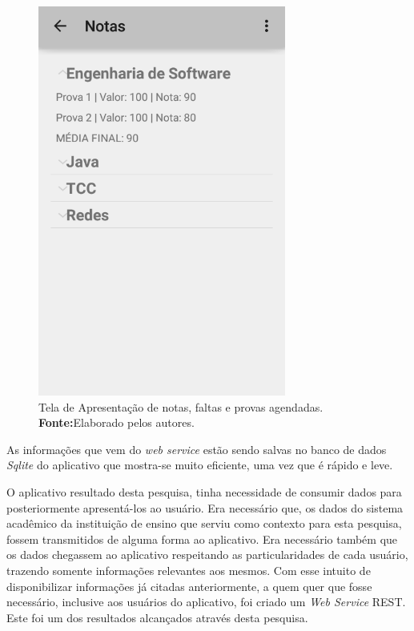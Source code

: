 \begin{figure}[h!]
	\centerline{\includegraphics[scale=0.5]{./imagens/3_discussao_resultados/dr3.png}}
	\caption[Tela de Apresentação de notas, faltas e provas agendadas]{Tela de
	Apresentação de notas, faltas e provas agendadas.
		\textbf{Fonte:}Elaborado pelos autores.}
	\label{fig:dr3}
\end{figure}

	\par As informações que vem do \textit{web service} estão sendo salvas no banco
de dados \textit{Sqlite} do aplicativo que mostra-se muito eficiente, uma vez
que é rápido e leve. 

	\par O aplicativo resultado desta pesquisa, tinha necessidade de consumir
dados para posteriormente apresentá-los ao usuário. Era necessário que, os
dados do sistema acadêmico da instituição de ensino que serviu como contexto
para esta pesquisa, fossem transmitidos de alguma forma ao aplicativo. Era
necessário também que os dados chegassem ao aplicativo respeitando as
particularidades de cada usuário, trazendo somente informações relevantes aos
mesmos. Com esse intuito de disponibilizar informações já citadas
anteriormente, a quem quer que fosse necessário, inclusive aos usuários do
aplicativo, foi criado um \textit{Web Service} REST. Este foi um dos resultados
alcançados através desta pesquisa.
	
